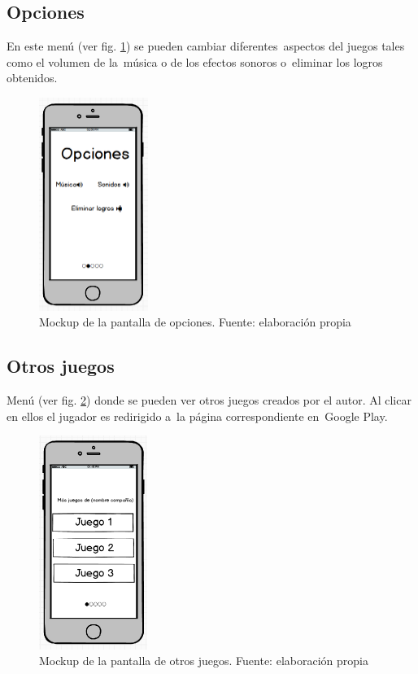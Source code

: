 \subsection[Opciones]{ Opciones}
\hypertarget{Toc484614219}{}{
En este men\'u (ver fig. \ref{mockupOpciones}) se pueden cambiar diferentes\ aspectos del juegos tales como el volumen de la\ m\'usica o de los efectos
sonoros o\ eliminar los logros obtenidos.}

\begin{figure}
    \begin{center}
 \includegraphics[width=1.3923in,height=2.72745in]{anexos/GDD/GDD-img005.png} 
    \caption{Mockup de la pantalla de opciones. Fuente: elaboración propia}
    \label{mockupOpciones}
    \end{center}

\end{figure}


\subsection[Otros juegos]{ Otros juegos}
\hypertarget{Toc484614220}{}{
Men\'u (ver fig. \ref{mockupJuegos}) donde se pueden ver otros juegos creados por el autor. Al clicar en ellos el jugador es redirigido a\ la p\'agina
correspondiente en\ Google Play.}

\begin{figure}
    \begin{center}
 \includegraphics[width=1.38953in,height=2.73205in]{anexos/GDD/GDD-img006.png} 
    \caption{Mockup de la pantalla de otros juegos. Fuente: elaboración propia}
    \label{mockupJuegos}
    \end{center}

\end{figure}


